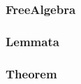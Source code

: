 
\subsubsection{FreeAlgebra}
\label{sec:freealgebra}


\subsubsection{Lemmata}
\label{sec:lemmata}


\subsubsection{Theorem}
\label{sec:theorem}

